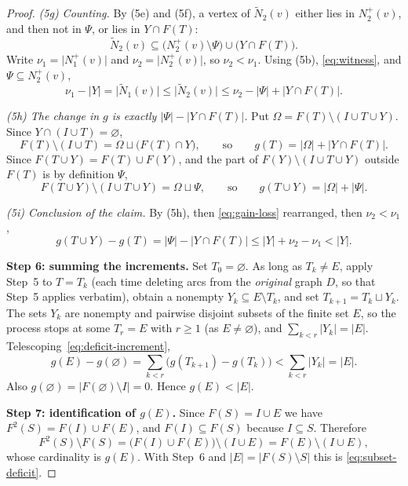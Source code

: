 \documentclass[11pt]{article}
\theoremstyle{remark}
\newcommand{\abs}[1]{\lvert #1\rvert}
\newcommand{\Step}[1]{\par\medskip\noindent\textbf{#1}\enspace}
\newcommand{\tN}{\widetilde N}
\begin{document}
\begin{proof}
\smallskip\noindent\emph{(5g) Counting.}
By (5e) and (5f), a vertex of $\tN_2(v)$ either lies in $N_2^+(v)$, and
then not in $\Psi$, or lies in $Y\cap F(T)$:
\[
 \tN_2(v)\subseteq\bigl(N_2^+(v)\setminus\Psi\bigr)\cup\bigl(Y\cap F(T)\bigr).
\]
Write $\nu_1=\abs{N_1^+(v)}$ and $\nu_2=\abs{N_2^+(v)}$, so
$\nu_2<\nu_1$. Using (5b), \eqref{eq:witness}, and
$\Psi\subseteq N_2^+(v)$,
\begin{equation}\label{eq:gain-loss}
  \nu_1-\abs{Y}=\abs{\tN_1(v)}
  \le \abs{\tN_2(v)}
  \le \nu_2-\abs{\Psi}+\abs{Y\cap F(T)}.
\end{equation}

\smallskip\noindent\emph{(5h) The change in $g$ is exactly
$\abs\Psi-\abs{Y\cap F(T)}$.}
Put $\Omega=F(T)\setminus(I\cup T\cup Y)$. Since
$Y\cap(I\cup T)=\varnothing$,
\[
 F(T)\setminus(I\cup T)=\Omega\sqcup\bigl(F(T)\cap Y\bigr),
 \qquad\text{so}\qquad g(T)=\abs\Omega+\abs{Y\cap F(T)}.
\]
Since $F(T\cup Y)=F(T)\cup F(Y)$, and the part of
$F(Y)\setminus(I\cup T\cup Y)$ outside $F(T)$ is by definition $\Psi$,
\[
 F(T\cup Y)\setminus(I\cup T\cup Y)=\Omega\sqcup\Psi,
 \qquad\text{so}\qquad g(T\cup Y)=\abs\Omega+\abs\Psi .
\]

\smallskip\noindent\emph{(5i) Conclusion of the claim.}
By (5h), then \eqref{eq:gain-loss} rearranged, then $\nu_2<\nu_1$,
\[
  g(T\cup Y)-g(T)
  =\abs{\Psi}-\abs{Y\cap F(T)}
  \le \abs{Y}+\nu_2-\nu_1
  <\abs{Y}.
\]

\Step{Step 6: summing the increments.}
Set $T_0=\varnothing$. As long as $T_k\ne E$, apply Step~5 to $T=T_k$
(each time deleting arcs from the \emph{original} graph $D$, so that
Step~5 applies verbatim), obtain a nonempty $Y_k\subseteq E\setminus T_k$,
and set $T_{k+1}=T_k\sqcup Y_k$. The sets $Y_k$ are nonempty and pairwise
disjoint subsets of the finite set $E$, so the process stops at some
$T_r=E$ with $r\ge1$ (as $E\ne\varnothing$), and
$\sum_{k<r}\abs{Y_k}=\abs E$. Telescoping~\eqref{eq:deficit-increment},
\[
 g(E)-g(\varnothing)=\sum_{k<r}\bigl(g(T_{k+1})-g(T_k)\bigr)
 <\sum_{k<r}\abs{Y_k}=\abs E .
\]
Also $g(\varnothing)=\abs{F(\varnothing)\setminus I}=0$. Hence
$g(E)<\abs E$.

\Step{Step 7: identification of $g(E)$.}
Since $F(S)=I\cup E$ we have $F^2(S)=F(I)\cup F(E)$, and
$F(I)\subseteq F(S)$ because $I\subseteq S$. Therefore
\[
  F^2(S)\setminus F(S)
  =\bigl(F(I)\cup F(E)\bigr)\setminus(I\cup E)
  =F(E)\setminus(I\cup E),
\]
whose cardinality is $g(E)$. With Step~6 and $\abs E=\abs{F(S)\setminus S}$
this is \eqref{eq:subset-deficit}.
\end{proof}
\end{document}

